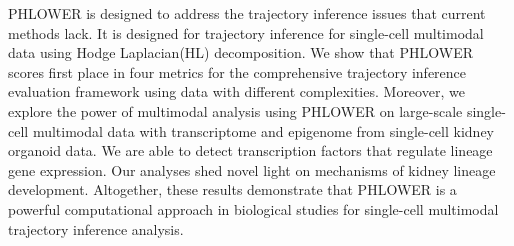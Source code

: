 PHLOWER is designed to address the trajectory inference issues that current methods lack. It is designed for trajectory inference for single-cell multimodal data using Hodge Laplacian(HL) decomposition. We show that PHLOWER scores first place in four metrics for the comprehensive trajectory inference evaluation framework using data with different complexities. Moreover, we explore the power of multimodal analysis using PHLOWER on large-scale single-cell multimodal data with transcriptome and epigenome from single-cell kidney organoid data. We are able to detect transcription factors that regulate lineage gene expression. Our analyses shed novel light on mechanisms of kidney lineage development. Altogether, these results demonstrate that PHLOWER is a powerful computational approach in biological studies for single-cell multimodal trajectory inference analysis.

